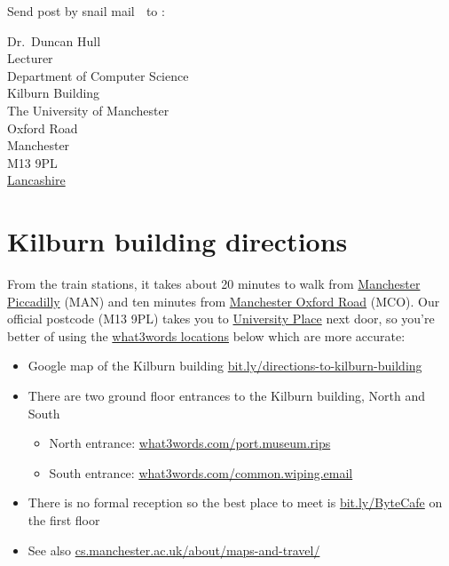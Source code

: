 \documentclass[
  12pt,
]{book}
\providecommand{\tightlist}{%
  \setlength{\itemsep}{0pt}\setlength{\parskip}{0pt}}
\begin{document}
Send post by snail mail 🐌 to :

Dr.~Duncan Hull\\
Lecturer\\
Department of Computer Science\\
Kilburn Building\\
The University of Manchester\\
Oxford Road\\
Manchester\\
M13 9PL\\
\href{https://duncan.hull.name/2019/07/05/mancashire/}{Lancashire} 🌹

\hypertarget{kilburn-building-directions}{%
\section{Kilburn building directions}\label{kilburn-building-directions}}

From the train stations, it takes about 20 minutes to walk from \href{https://www.nationalrail.co.uk/stations_destinations/man.aspx}{Manchester Piccadilly} (MAN) and ten minutes from \href{https://www.nationalrail.co.uk/stations/mco/details.aspx}{Manchester Oxford Road} (MCO). Our official postcode (M13 9PL) takes you to \href{http://www.conference.manchester.ac.uk/venues/search/details/?property=10}{University Place} next door, so you're better of using the \href{https://www.bbc.co.uk/news/uk-england-49319760}{what3words locations} \citep{what3words} below which are more accurate:

\begin{itemize}
\tightlist
\item
  Google map of the Kilburn building \href{http://bit.ly/directions-to-kilburn-building}{bit.ly/directions-to-kilburn-building}
\item
  There are two ground floor entrances to the Kilburn building, North and South

  \begin{itemize}
  \tightlist
  \item
    North entrance: \href{https://what3words.com/port.museum.rips}{what3words.com/port.museum.rips}
  \item
    South entrance: \href{https://what3words.com/common.wiping.email}{what3words.com/common.wiping.email}
  \end{itemize}
\item
  There is no formal reception so the best place to meet is \href{http://bit.ly/ByteCafe}{bit.ly/ByteCafe} on the first floor
\item
  See also \href{https://www.cs.manchester.ac.uk/about/maps-and-travel/}{cs.manchester.ac.uk/about/maps-and-travel/}
\end{itemize}
\end{document}
